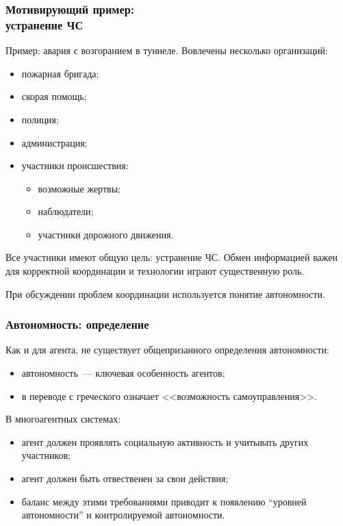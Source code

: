 \documentclass{beamer}
\begin{document}
\begin{frame}
  \frametitle{Мотивирующий пример: \\ устранение ЧС}
  Пример: авария с возгоранием в туннеле. Вовлечены несколько организаций:
  \begin{itemize}
    \item пожарная бригада;
    \item скорая помощь;
    \item полиция;
    \item администрация;
    \item участники происшествия:
      \begin{itemize}
        \item возможные жертвы;
        \item наблюдатели;
        \item участники дорожного движения.
      \end{itemize}
  \end{itemize}

  Все участники имеют общую цель: устранение ЧС. Обмен информацией важен для корректной
  координации и технологии играют существенную роль.

  При обсуждении проблем координации используется понятие автономности.
\end{frame}

\begin{frame}
  \frametitle{Автономность: определение}
  Как и для агента, не существует общепризанного определения автономности:
  \begin{itemize}
    \item автономность~--- ключевая особенность агентов;
    \item в переводе с греческого означает <<возможность самоуправления>>.
  \end{itemize}

  В многоагентных системах:
  \begin{itemize}
    \item агент должен проявлять социальную активность и учитывать других участников;
    \item агент должен быть отвественен за свои действия;
    \item баланс между этими требованиями приводит к появлению ``уровней автономности''
      и контролируемой автономности.
  \end{itemize}
\end{frame}
\end{document}
